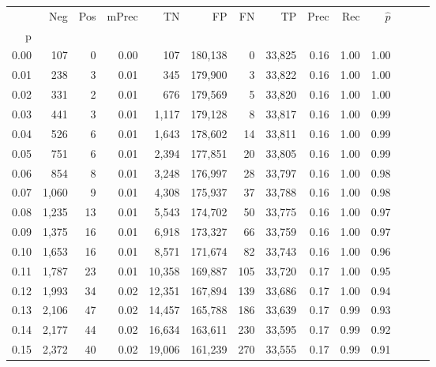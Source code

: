\begin{tabular}{rrrrrrrrrrrrrr}
\toprule
{} &    Neg &  Pos & mPrec &       TN &       FP &      FN &      TP &  Prec &   Rec & $\hat{p}$ \\
p    &        &      &       &          &          &         &         &       &       &           \\
\midrule
0.00 &    107 &    0 &  0.00 &      107 &  180,138 &       0 &  33,825 &  0.16 &  1.00 &      1.00 \\
0.01 &    238 &    3 &  0.01 &      345 &  179,900 &       3 &  33,822 &  0.16 &  1.00 &      1.00 \\
0.02 &    331 &    2 &  0.01 &      676 &  179,569 &       5 &  33,820 &  0.16 &  1.00 &      1.00 \\
0.03 &    441 &    3 &  0.01 &    1,117 &  179,128 &       8 &  33,817 &  0.16 &  1.00 &      0.99 \\
0.04 &    526 &    6 &  0.01 &    1,643 &  178,602 &      14 &  33,811 &  0.16 &  1.00 &      0.99 \\
0.05 &    751 &    6 &  0.01 &    2,394 &  177,851 &      20 &  33,805 &  0.16 &  1.00 &      0.99 \\
0.06 &    854 &    8 &  0.01 &    3,248 &  176,997 &      28 &  33,797 &  0.16 &  1.00 &      0.98 \\
0.07 &  1,060 &    9 &  0.01 &    4,308 &  175,937 &      37 &  33,788 &  0.16 &  1.00 &      0.98 \\
0.08 &  1,235 &   13 &  0.01 &    5,543 &  174,702 &      50 &  33,775 &  0.16 &  1.00 &      0.97 \\
0.09 &  1,375 &   16 &  0.01 &    6,918 &  173,327 &      66 &  33,759 &  0.16 &  1.00 &      0.97 \\
0.10 &  1,653 &   16 &  0.01 &    8,571 &  171,674 &      82 &  33,743 &  0.16 &  1.00 &      0.96 \\
0.11 &  1,787 &   23 &  0.01 &   10,358 &  169,887 &     105 &  33,720 &  0.17 &  1.00 &      0.95 \\
0.12 &  1,993 &   34 &  0.02 &   12,351 &  167,894 &     139 &  33,686 &  0.17 &  1.00 &      0.94 \\
0.13 &  2,106 &   47 &  0.02 &   14,457 &  165,788 &     186 &  33,639 &  0.17 &  0.99 &      0.93 \\
0.14 &  2,177 &   44 &  0.02 &   16,634 &  163,611 &     230 &  33,595 &  0.17 &  0.99 &      0.92 \\
0.15 &  2,372 &   40 &  0.02 &   19,006 &  161,239 &     270 &  33,555 &  0.17 &  0.99 &      0.91 \\

\end{tabular}
